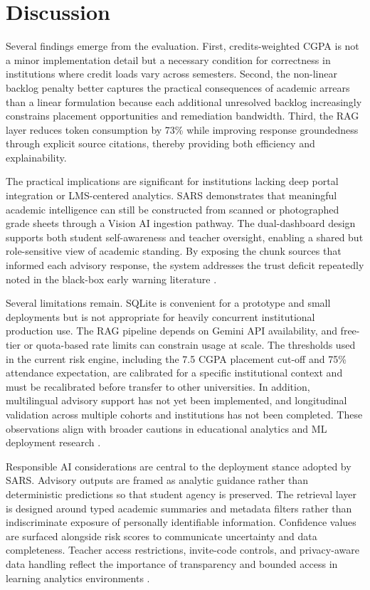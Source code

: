 \documentclass[conference]{IEEEtran}
\begin{document}
\section{Discussion}
Several findings emerge from the evaluation. First, credits-weighted CGPA is not a minor implementation detail but a necessary condition for correctness in institutions where credit loads vary across semesters. Second, the non-linear backlog penalty better captures the practical consequences of academic arrears than a linear formulation because each additional unresolved backlog increasingly constrains placement opportunities and remediation bandwidth. Third, the RAG layer reduces token consumption by 73\% while improving response groundedness through explicit source citations, thereby providing both efficiency and explainability.

The practical implications are significant for institutions lacking deep portal integration or LMS-centered analytics. SARS demonstrates that meaningful academic intelligence can still be constructed from scanned or photographed grade sheets through a Vision AI ingestion pathway. The dual-dashboard design supports both student self-awareness and teacher oversight, enabling a shared but role-sensitive view of academic standing. By exposing the chunk sources that informed each advisory response, the system addresses the trust deficit repeatedly noted in the black-box early warning literature \cite{jayaprakash2014early,khosravi2022xai,conati2018interpretable}.

Several limitations remain. SQLite is convenient for a prototype and small deployments but is not appropriate for heavily concurrent institutional production use. The RAG pipeline depends on Gemini API availability, and free-tier or quota-based rate limits can constrain usage at scale. The thresholds used in the current risk engine, including the 7.5 CGPA placement cut-off and 75\% attendance expectation, are calibrated for a specific institutional context and must be recalibrated before transfer to other universities. In addition, multilingual advisory support has not yet been implemented, and longitudinal validation across multiple cohorts and institutions has not been completed. These observations align with broader cautions in educational analytics and ML deployment research \cite{hussain2019predicting,summers2021predicting}.

Responsible AI considerations are central to the deployment stance adopted by SARS. Advisory outputs are framed as analytic guidance rather than deterministic predictions so that student agency is preserved. The retrieval layer is designed around typed academic summaries and metadata filters rather than indiscriminate exposure of personally identifiable information. Confidence values are surfaced alongside risk scores to communicate uncertainty and data completeness. Teacher access restrictions, invite-code controls, and privacy-aware data handling reflect the importance of transparency and bounded access in learning analytics environments \cite{ifenthaler2016privacy,khosravi2022xai}.
\end{document}
